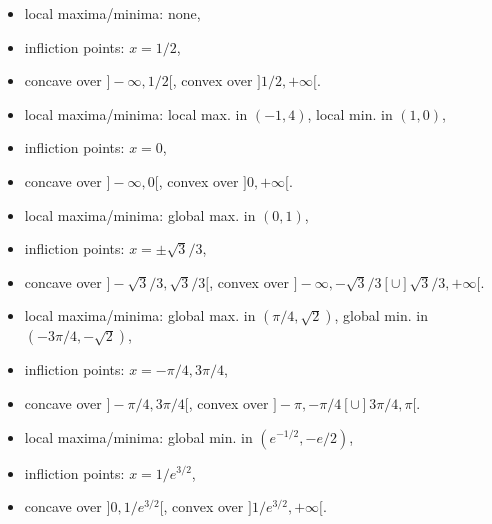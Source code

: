 \begin{Answer}\phantom{}
    
        \Question 
            \begin{itemize}
                \item local maxima/minima: none,
                \item infliction points: $x=1/2$,
                \item concave over $]-\infty, 1/2[$, convex over $] 1/2, +\infty[$.
             \end{itemize}
             \ifcalculus
        \Question 
            \begin{itemize}
                \item local maxima/minima: local max. in $(-1,4)$, local min. in $(1,0)$,
                \item infliction points: $x=0$,
                \item concave over $]-\infty, 0[$, convex over $] 0, +\infty[$.
             \end{itemize}
             \fi
        \Question 
           \begin{itemize}
                \item local maxima/minima: global max. in $(0,1)$,
                \item infliction points: $x=\pm \sqrt{3}/3$,
                \item concave over $]-\sqrt{3}/3, \sqrt{3}/3[$, convex over $]-\infty, -\sqrt{3}/3[ \cup ]\sqrt{3}/3, +\infty[$.
             \end{itemize}
             
        \Question 
            \begin{itemize}
                \item local maxima/minima: global max. in $(\pi/4,\sqrt{2})$, global min. in $(-3\pi/4,-\sqrt{2})$,
                \item infliction points: $x=- \pi/4, 3\pi/4$,
                \item concave over $]- \pi/4, 3\pi/4[$, convex over $]-\pi, -\pi/4[ \cup ]3\pi/4, \pi[$.
            \end{itemize}
            
        \Question 
            \begin{itemize}
                \item local maxima/minima: global min. in $(e^{-1/2},-e/2)$,
                \item infliction points: $x=1/e^{3/2}$,
                \item concave over $]0, 1/e^{3/2}[$, convex over $]1/e^{3/2}, + \infty[$.
            \end{itemize}
   
\end{Answer}


